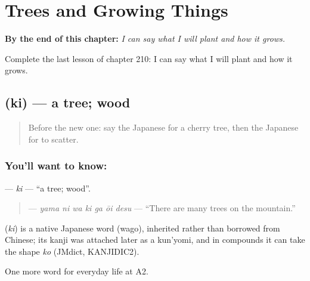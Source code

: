 
\chapter{Trees and Growing Things}
\label{ch:ja-trees-and-growing-things}

\begin{chapteropening}
\textbf{By the end of this chapter:} \emph{I can say what I will plant and how it grows.}

Complete the last lesson of chapter 210: I can say what I will plant and how it grows.
\end{chapteropening}

\section[\texorpdfstring{\ja{き} (ki)}{き (ki)}]{ (ki) — a tree; wood}

\label{lesson:JA-C210-ki-tree}



\begin{quote}
Before the new one: say the Japanese for a cherry tree, then the Japanese for to scatter.
\end{quote}

\subsection*{You'll want to know: }
\textbf{} — \emph{ki} — \textquotedblleft{}a tree; wood\textquotedblright{}.

\begin{quote}
\textbf{  } — \emph{yama ni wa ki ga ōi desu} — \textquotedblleft{}There are many trees on the mountain.\textquotedblright{}
\end{quote}

\begin{cousinweb}
\textbf{} (\emph{ki}) is a native Japanese word (wago), inherited rather than borrowed from Chinese; its kanji was attached later as a kun'yomi, and in compounds it can take the shape \emph{ko} (JMdict, KANJIDIC2).
\end{cousinweb}

\begin{grammarlens}[title={What you've built}]
One more word for everyday life at A2.
\end{grammarlens}

